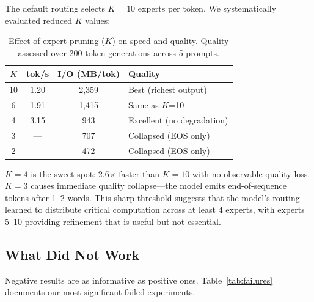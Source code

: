 \documentclass[11pt,twocolumn]{article}
\begin{document}
The default routing selects $K=10$ experts per token.
We systematically evaluated reduced $K$ values:

\begin{table}[t]
\centering
\small
\caption{Effect of expert pruning ($K$) on speed and quality. Quality assessed over 200-token generations across 5 prompts.}
\label{tab:pruning}
\begin{tabular}{@{}cccl@{}}
\toprule
$K$ & \textbf{tok/s} & \textbf{I/O (MB/tok)} & \textbf{Quality} \\
\midrule
10 & 1.20 & 2{,}359 & Best (richest output) \\
6 & 1.91 & 1{,}415 & Same as $K$=10 \\
4 & 3.15 & 943 & Excellent (no degradation) \\
3 & --- & 707 & Collapsed (EOS only) \\
2 & --- & 472 & Collapsed (EOS only) \\
\bottomrule
\end{tabular}
\end{table}

$K=4$ is the sweet spot: 2.6$\times$ faster than $K=10$ with no observable quality loss.
$K=3$ causes immediate quality collapse---the model emits end-of-sequence tokens after 1--2 words.
This sharp threshold suggests that the model's routing learned to distribute critical computation across at least 4 experts, with experts 5--10 providing refinement that is useful but not essential.

\subsection{What Did Not Work}
\label{sec:negative}

Negative results are as informative as positive ones.
Table~\ref{tab:failures} documents our most significant failed experiments.
\end{document}

